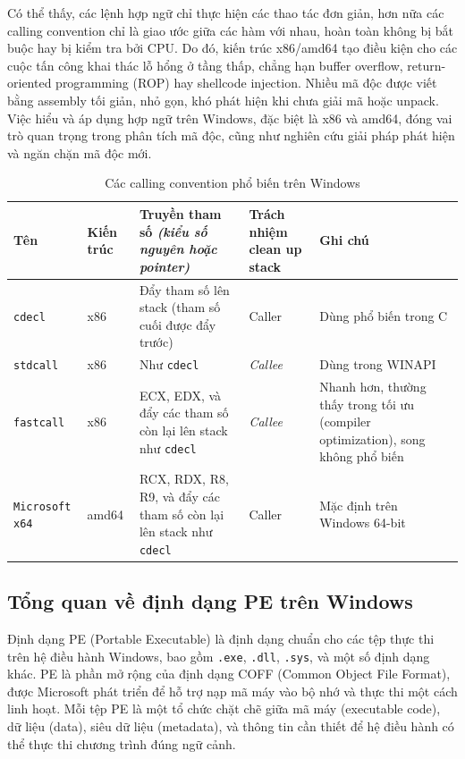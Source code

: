 Có thể thấy, các lệnh hợp ngữ chỉ thực hiện các thao tác đơn
giản, hơn nữa các calling convention chỉ là giao ước giữa
các hàm với nhau, hoàn toàn không bị bắt buộc hay bị kiểm
tra bởi CPU. Do đó, kiến trúc x86/amd64 tạo điều kiện cho
các cuộc tấn công khai thác lỗ hổng ở tầng thấp, chẳng hạn
buffer overflow, return-oriented programming (ROP) hay
shellcode injection. Nhiều mã độc được viết
bằng assembly tối giản, nhỏ gọn, khó phát hiện khi chưa
giải mã hoặc unpack. Việc hiểu và áp dụng hợp ngữ trên
Windows, đặc biệt là x86 và amd64, đóng vai trò quan
trọng trong phân tích mã độc, cũng như nghiên cứu giải
pháp phát hiện và ngăn chặn mã độc mới.

\begin{table}[h]
  \centering
  \begin{tabularx}{\textwidth}{|X|X|X|X|X|}
  \hline
  \textbf{Tên} & \textbf{Kiến trúc} & \textbf{Truyền tham số \textit{(kiểu số nguyên hoặc pointer)}} & \textbf{Trách nhiệm clean up stack} & \textbf{Ghi chú} \\
  \hline
  \texttt{cdecl} & x86 & Đẩy tham số lên stack (tham số cuối được đẩy trước) & Caller & Dùng phổ biến trong C \\
  \hline
  \texttt{stdcall} & x86 & Như \texttt{cdecl} & \textit{Callee} & Dùng trong WINAPI \\
  \hline
  \texttt{fastcall} & x86 & ECX, EDX, và đẩy các tham số còn lại lên stack như \texttt{cdecl} & \textit{Callee} & Nhanh hơn, thường thấy trong tối ưu (compiler optimization), song không phổ biến \\
  \hline
  \texttt{Microsoft x64} & amd64 & RCX, RDX, R8, R9, và đẩy các tham số còn lại lên stack như \texttt{cdecl} & Caller & Mặc định trên Windows 64-bit \\
  \hline
  \end{tabularx}
  \caption{Các calling convention phổ biến trên Windows}
  \label{tab:calling-conventions}
\end{table}








\subsection{Tổng quan về định dạng PE trên Windows}

Định dạng PE (Portable Executable) \cite{ms-pe-format} \cite{rickpefilestructure}
là định dạng chuẩn
cho các tệp thực thi trên hệ điều hành Windows, bao gồm \texttt{.exe},
\texttt{.dll}, \texttt{.sys}, và một số định dạng khác. PE là phần mở
rộng của định dạng COFF (Common Object File Format), được Microsoft
phát triển để hỗ trợ nạp mã máy vào bộ nhớ và thực thi một cách linh
hoạt. Mỗi tệp PE là một tổ chức chặt chẽ giữa mã máy (executable
code), dữ liệu (data), siêu dữ liệu (metadata), và thông tin cần thiết
để hệ điều hành có thể thực thi chương trình đúng ngữ cảnh.

